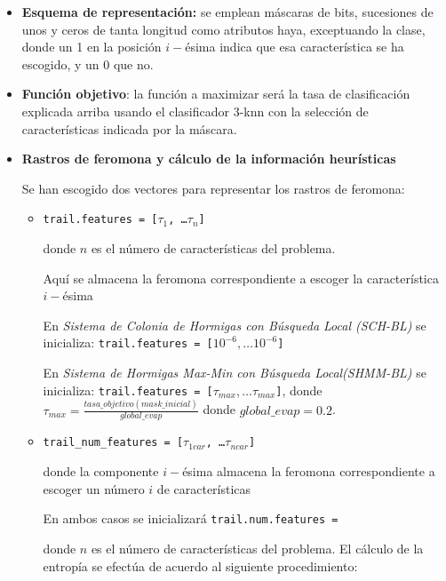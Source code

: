 \documentclass[a4paper,11pt]{article}
\begin{document}
\begin{itemize} 
\item \textbf{Esquema de representación:} se emplean máscaras de bits, sucesiones de unos y ceros de tanta longitud como atributos haya,
exceptuando la clase, donde un 1 en la posición $i-$ésima indica que esa característica se ha escogido, y un $0$ que no.

\item \textbf{Función objetivo}: la función a maximizar será la tasa de clasificación explicada arriba usando el clasificador
3-knn con la selección de características indicada por la máscara.\\

  \small\texttt{}
  \normalsize
  
\item \textbf{Rastros de feromona y cálculo de la información heurísticas}

Se han escogido dos vectores para representar los rastros de feromona:

\begin{itemize}
  \item \texttt{trail.features = [$\tau_1$, \ldots $\tau_n$]}
  
    donde $n$ es el número de características del problema.
    
    Aquí se almacena la feromona correspondiente a escoger la característica $i-$ésima
    
    En \textit{Sistema de Colonia de Hormigas con Búsqueda Local (SCH-BL)} se inicializa: \texttt{trail.features = [$10^{-6},\ldots 10^{-6}$]}
    
    En \textit{Sistema de Hormigas Max-Min con Búsqueda Local(SHMM-BL)} se inicializa: \texttt{trail.features = [$\tau_{max},\ldots \tau_{max}$]},
    donde \texttt{$\tau_{max} = \frac{tasa\_objetivo(mask\_inicial)}{global\_evap}$} donde $global\_evap = 0.2$.
  \item \texttt{trail\_num\_features = [$\tau_{1 car}$, \ldots $\tau_{n car}$]}
  
    donde la componente $i-$ésima almacena la feromona correspondiente a escoger un número $i$ de características
    
    En ambos casos se inicializará \texttt{trail.num.features = }
    
    donde $n$ es el número de características del problema.
  El cálculo de la entropía se efectúa de acuerdo al siguiente procedimiento:\\


\end{itemize}
\end{itemize}
\end{document}
